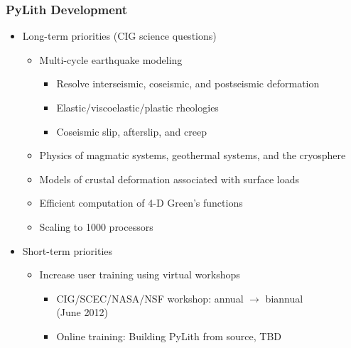 \documentclass{beamer}
\begin{document}
\begin{frame}
  \frametitle{PyLith Development}
  \summary{}

  \begin{itemize}
  \item Long-term priorities (CIG science questions)
    \begin{itemize}
    \item Multi-cycle earthquake modeling
      \begin{itemize}
      \item Resolve interseismic, coseismic, and postseismic deformation
      \item Elastic/viscoelastic/plastic rheologies
      \item Coseismic slip, afterslip, and creep
      \end{itemize}
    \item Physics of magmatic systems, geothermal systems, and the cryosphere
    \item Models of crustal deformation associated with surface loads
   \item Efficient computation of 4-D Green's functions
    \item Scaling to 1000 processors
   \end{itemize}
  \item Short-term priorities
    \begin{itemize}
    \item Increase user training using virtual workshops
    \begin{itemize}
      \item CIG/SCEC/NASA/NSF workshop: annual $\rightarrow$ biannual\\
        (June 2012)
      \item Online training: Building PyLith from source, TBD
      \end{itemize}
    \end{itemize}
  \end{itemize}

\end{frame}
\end{document}
